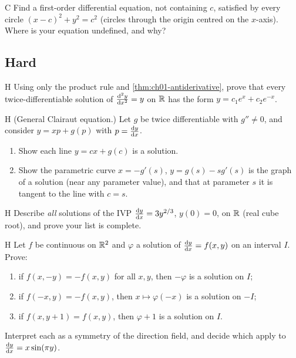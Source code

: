 \begin{problem}{C}\label{prob:ch01-c8}
Find a first-order differential equation, not containing $c$, satisfied by
every circle $(x - c)^2 + y^2 = c^2$ (circles through the origin centred on the
$x$-axis). Where is your equation undefined, and why?
\end{problem}

\subsection*{Hard}

\begin{problem}{H}\label{prob:ch01-h1}
Using only the product rule and \cref{thm:ch01-antiderivative}, prove that every
twice-differentiable solution of $\frac{\mathrm{d}^{2}y}{\mathrm{d}x^{2}} = y$ on $\mathbb{R}$ has the form
$y = c_1e^x + c_2e^{-x}$.
\end{problem}

\begin{problem}{H}\label{prob:ch01-h2}
(General Clairaut equation.) Let $g$ be twice differentiable with $g''\neq 0$,
and consider $y = xp + g(p)$ with $p = \frac{\mathrm{d}y}{\mathrm{d}x}$.
\begin{enumerate}[label=(\alph*)]
  \item Show each line $y = cx + g(c)$ is a solution.
  \item Show the parametric curve $x = -g'(s)$, $y = g(s) - sg'(s)$ is the
        graph of a solution (near any parameter value), and that at parameter
        $s$ it is tangent to the line with $c = s$.
\end{enumerate}
\end{problem}

\begin{problem}{H}\label{prob:ch01-h3}
Describe \emph{all} solutions of the IVP $\frac{\mathrm{d}y}{\mathrm{d}x} = 3y^{2/3}$, $y(0) = 0$,
on $\mathbb{R}$ (real cube root), and prove your list is complete.
\end{problem}

\begin{problem}{H}\label{prob:ch01-h4}
Let $f$ be continuous on $\mathbb{R}^2$ and $\varphi$ a solution of
$\frac{\mathrm{d}y}{\mathrm{d}x} = f(x,y)$ on an interval $I$. Prove:
\begin{enumerate}[label=(\alph*)]
  \item if $f(x,-y) = -f(x,y)$ for all $x,y$, then $-\varphi$ is a solution on $I$;
  \item if $f(-x,y) = -f(x,y)$, then $x\mapsto\varphi(-x)$ is a solution on $-I$;
  \item if $f(x,y+1) = f(x,y)$, then $\varphi + 1$ is a solution on $I$.
\end{enumerate}
Interpret each as a symmetry of the direction field, and decide which apply to
$\frac{\mathrm{d}y}{\mathrm{d}x} = x\sin(\pi y)$.
\end{problem}

